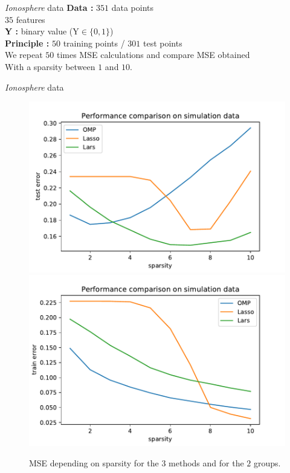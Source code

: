 \documentclass[unknownkeysallowed]{beamer}
\begin{document}
\begin{frame}{\textit{Ionosphere} data}
\textbf{Data : }$351$ data points\\
\hspace{1.2cm}  $35$ features\\
\vspace{0.5cm}
\textbf{Y : }binary value (Y$\in \{0,1\}$)\\
\vspace{0.5cm}
\textbf{Principle : }$50$ training points / $301$ test points\\
We repeat $50$ times MSE calculations and compare MSE obtained\\
With a sparsity between $1$ and $10$.
\end{frame}

\begin{frame}{\textit{Ionosphere} data}
\begin{figure}
    \centering
    \includegraphics[scale=0.35]{./images/test_error_ionosphere.pdf}
    \includegraphics[scale=0.35]{./images/training_error_ionosphere.pdf}
    \caption{MSE depending on sparsity for the $3$ methods and for the $2$ groups.}
\end{figure}
\end{frame}
\end{document}
